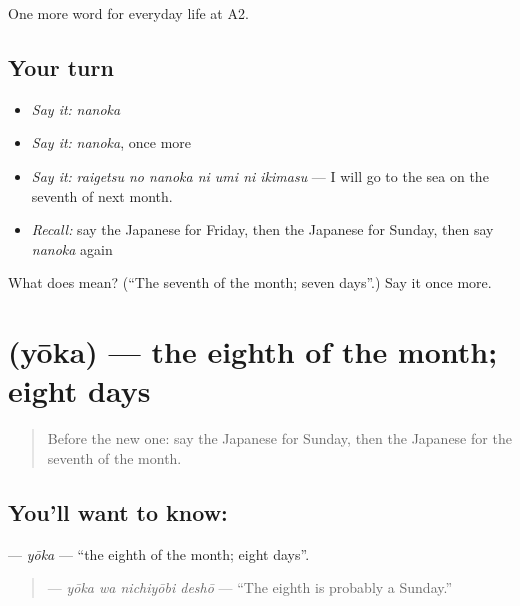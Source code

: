 \begin{grammarlens}[title={What you've built}]
One more word for everyday life at A2.
\end{grammarlens}

\subsection*{Your turn}
\begin{itemize}
\raggedright
  \item \emph{Say it:} \emph{nanoka}
  \item \emph{Say it:} \emph{nanoka}, once more
  \item \emph{Say it:} \emph{raigetsu no nanoka ni umi ni ikimasu} — I will go to the sea on the seventh of next month.
  \item \emph{Recall:} say the Japanese for Friday, then the Japanese for Sunday, then say \emph{nanoka} again
\end{itemize}

\begin{tcolorbox}[breakable,colback=teal!4,colframe=teal!35!black,title={Before you move on}]
What does  mean? (\textquotedblleft{}The seventh of the month; seven days\textquotedblright{}.) Say it once more.
\end{tcolorbox}
\section[\texorpdfstring{\ja{ようか} (yōka)}{ようか (yōka)}]{ (yōka) — the eighth of the month; eight days}

\label{lesson:JA-C165-youka}



\begin{quote}
Before the new one: say the Japanese for Sunday, then the Japanese for the seventh of the month.
\end{quote}

\subsection*{You'll want to know: }
\textbf{} — \emph{yōka} — \textquotedblleft{}the eighth of the month; eight days\textquotedblright{}.

\begin{quote}
\textbf{ } — \emph{yōka wa nichiyōbi deshō} — \textquotedblleft{}The eighth is probably a Sunday.\textquotedblright{}
\end{quote}

